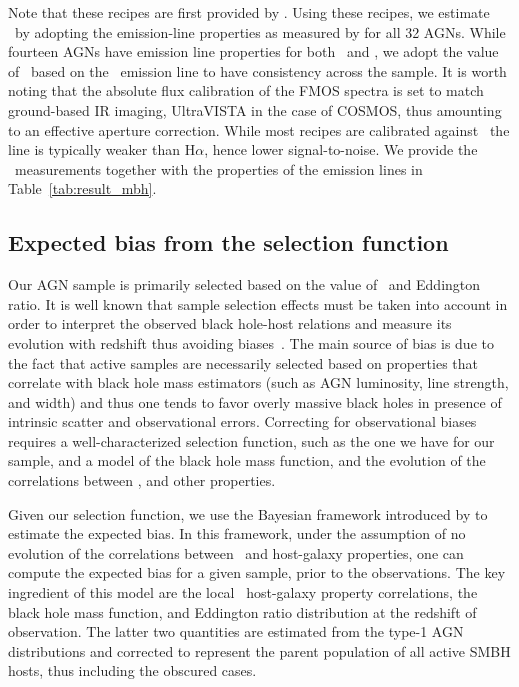 \documentclass[apj]{emulateapj}
\begin{document}
Note that these recipes are first provided by \citet{Vestergaard2006}. Using these recipes, we estimate \mbh\ by adopting the emission-line properties as measured by \citet{Schulze2018} for all 32 AGNs. While fourteen AGNs have emission line properties for both \halpha\ and \hbeta, we adopt the value of \mbh\ based on the \halpha\ emission line to have consistency across the sample. It is worth noting that the absolute flux calibration of the FMOS spectra is set to match ground-based IR imaging, UltraVISTA in the case of COSMOS, thus amounting to an effective aperture correction. While most recipes are calibrated against \hbeta\, the line is typically weaker than H$\alpha$, hence lower signal-to-noise. We provide the \mbh\ measurements together with the properties of the emission lines in Table~\ref{tab:result_mbh}. 


\subsection{Expected bias from the selection function}

\label{sec:sf_framework}

Our AGN sample is primarily selected based on the value of \mbh~and Eddington ratio. It is well known that sample selection effects must be taken into account in order to  interpret the observed black hole-host relations and measure its evolution with redshift thus avoiding biases~\citep{Tre++07,Schulze2011,Bennert++2011, Schulze2014,Park15}. The main source of bias is due to the fact that active samples are necessarily selected based on properties that correlate with black hole mass estimators (such as AGN luminosity, line strength, and width) and thus one tends to favor overly massive black holes in presence of intrinsic scatter and observational errors. Correcting for observational biases requires a well-characterized selection function, such as the one we have for our sample, and a model of the black hole mass function, and the evolution of the correlations between \mbh, and other properties.

Given our selection function, we use the Bayesian framework introduced by \citet{Schulze2011,Schulze2014} to estimate the expected bias. In this framework, under the assumption of no evolution of the correlations between \mbh\ and host-galaxy properties, one can compute the expected bias for a given sample, prior to the observations. The key ingredient of this model are the local \mbh\ host-galaxy property correlations, the black hole mass function, and Eddington ratio distribution at the redshift of observation. The latter two quantities are estimated from the type-1 AGN distributions \citep{Schulze2015} and corrected to represent the parent population of all active SMBH hosts, thus including the obscured cases. 
\end{document}
